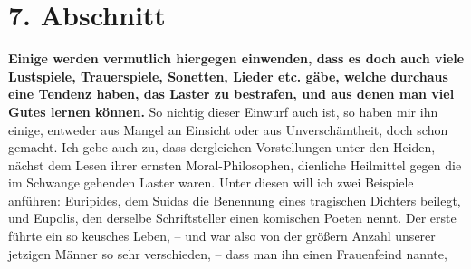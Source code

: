 \section{7. Abschnitt} \label{kap17_ab7}

\label{ref:17_07_einwand}
\textbf{Einige werden vermutlich hiergegen einwenden, dass es doch auch viele
Lustspiele, Trauerspiele, Sonetten, Lieder etc. gäbe, welche durchaus eine
Tendenz haben, das Laster zu bestrafen, und aus denen man viel Gutes lernen
können.} So nichtig dieser Einwurf auch ist, so haben mir ihn einige, entweder aus
Mangel an Einsicht oder aus Unverschämtheit, doch schon gemacht. Ich gebe
auch zu, dass dergleichen Vorstellungen unter den Heiden, nächst dem Lesen ihrer
ernsten Moral-Philosophen, dienliche Heilmittel gegen die im Schwange gehenden
Laster waren. Unter diesen will ich zwei Beispiele anführen:
Euripides, dem
Suidas die Benennung eines tragischen Dichters beilegt, und
Eupolis, den
derselbe Schriftsteller einen komischen Poeten nennt. Der erste führte ein so
keusches Leben, -- und war also von der größern Anzahl unserer jetzigen Männer
so sehr verschieden, -- dass man ihn einen Frauenfeind nannte,

\medskip

